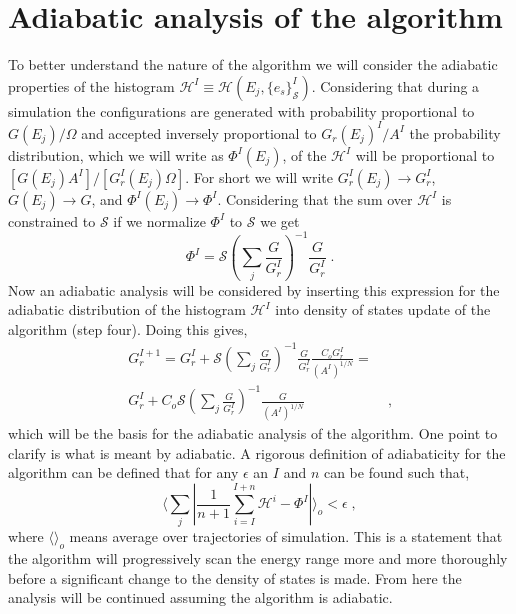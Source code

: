 \documentclass[aps,pre,reprint,superscriptaddress,showkeys]{revtex4-1}
\begin{document}
\section{Adiabatic analysis of the algorithm}
\label{sec3}
To better understand the nature of the algorithm we will consider the adiabatic properties of the histogram $\mathcal{H}^I\equiv \mathcal{H}(E_j, \{e_s\}_\mathcal{S}^I)$. Considering that during a simulation the configurations are generated with probability proportional to $G(E_j)/\Omega$ and accepted inversely proportional to $G_{r}(E_j)^I/A^I$ the probability distribution, which we will write as $\Phi^I(E_j)$, of the $\mathcal{H}^I$ will be proportional to $[G(E_j)A^I]/[G_r^I(E_j)\Omega]$. For short we will write $G_r^I(E_j) \rightarrow G_r^I$, $G(E_j)\rightarrow G$, and $\Phi^I(E_j)\rightarrow \Phi^I$.  Considering that the sum over $\mathcal{H}^I$ is constrained to $\mathcal{S}$ if we normalize $\Phi^I$ to $\mathcal{S}$ we get
\begin{equation}
\Phi^I = \mathcal{S}(\sum_{j}\frac{G}{G_r^I})^{-1}\frac{G}{G_r^I} \;.
\label{adiabatic_distribution}
\end{equation}
Now an adiabatic analysis will be considered by inserting this expression for the adiabatic distribution of the histogram $\mathcal{H}^I$ into density of states update of the algorithm (step four).  Doing this gives, 
\begin{equation}
\begin{split}
G_r^{I+1} = G_r^I  +   \mathcal{S}(\sum_{j}\frac{G}{G_r^I})^{-1}\frac{G}{G_r^I}\frac{C_oG_r^I}{(A^I)^{1/N}} =\\
 G_r^I  +   C_o\mathcal{S}(\sum_{j}\frac{G}{G_r^I})^{-1}\frac{G}{(A^I)^{1/N}} & \;,
\end{split}
\label{adiabatic_update}
\end{equation}
which will be the basis for the adiabatic analysis of the algorithm. One point to clarify is what is meant by adiabatic. A rigorous definition of adiabaticity for the algorithm can be defined that for any $\epsilon$ an  $I$ and $n$ can be found such that, 
\begin{equation}
  \langle \sum_j |\frac{1}{n+1}{\sum_{i=I}^{I+n}\mathcal{H}^i -  \Phi^I}| \rangle_o < \epsilon \;,
\end{equation}
where $\langle \rangle_o$ means average over trajectories of simulation. This is a statement that the algorithm will progressively scan the energy range more and more thoroughly before a significant change to the density of states is made.   From here the analysis will be continued assuming the algorithm is adiabatic. 
\end{document}

